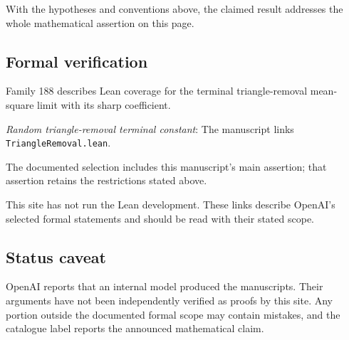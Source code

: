 \documentclass[11pt]{article}
\begin{document}
With the hypotheses and conventions above, the claimed result addresses the whole mathematical assertion on this page.

\subsection{Formal verification}
Family 188 describes Lean coverage for the terminal triangle-removal mean-square limit with its sharp coefficient.

\textit{Random triangle-removal terminal constant}: The manuscript links \texttt{TriangleRemoval.lean}.

The documented selection includes this manuscript’s main assertion; that assertion retains the restrictions stated above.

This site has not run the Lean development. These links describe OpenAI’s selected formal statements and should be read with their stated scope.

\subsection{Status caveat}
OpenAI reports that an internal model produced the manuscripts. Their arguments have not been independently verified as proofs by this site. Any portion outside the documented formal scope may contain mistakes, and the catalogue label reports the announced mathematical claim.
\end{document}
